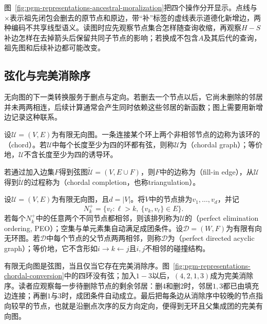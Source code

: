 图~\ref{fig:pgm-representations-ancestral-moralization}把四个操作分开显示。点线与$\times$表示祖先闭包会删去的原节点和原边，带“补”标签的虚线表示道德化新增边，两种编码不共享线型语义。读图时应先观察节点集合怎样随查询收缩，再观察$H-S$补边怎样在去掉箭头后保留共同子节点的影响；若换成不包含$A$及其后代的查询，祖先图和后续补边都可能改变。

\subsection{弦化与完美消除序}
\label{sec:pgm-representations-chordal-conversion}

无向图的下一类转换服务于删点与定向。若删去一个节点以后，它尚未删除的邻居并未两两相连，后续计算通常会产生同时依赖这些邻居的新函数；图上需要用新增边记录这种联系。

\begin{definition}[弦图与弦化]
  \label{def:pgm-representations-chordal-completion}
  设$\mathcal{U}=(V,E)$为有限无向图。一条连接某个环上两个非相邻节点的边称为该环的（chord）。若$\mathcal{U}$中每个长度至少为四的环都有弦，则称$\mathcal{U}$为（chordal graph）；等价地，$\mathcal{U}$不含长度至少为四的诱导环。

  若通过加入边集$F$得到弦图$\widetilde{\mathcal{U}}=(V,E\cup F)$，则$F$中的边称为（fill-in edge），从$\mathcal{U}$得到$\widetilde{\mathcal{U}}$的过程称为（chordal completion，也称triangulation）。
\end{definition}

\begin{definition}[完美消除序与完美有向图]
  \label{def:pgm-representations-perfect-elimination}
  设$\mathcal{U}=(V,E)$为有限无向图，且$d=|V|$。将$V$中的节点排为$v_1,\ldots,v_d$，并记
  \[
    N_k^+=
    \{v_\ell:\ell>k,\ \{v_k,v_\ell\}\in E\}.
  \]
  若每个$N_k^+$中的任意两个不同节点都相邻，则该排列称为$\mathcal{U}$的（perfect elimination ordering, PEO）；空集与单元素集自动满足成团条件。设$\mathcal{D}=(W,F)$为有限有向无环图。若$\mathcal{D}$中每个节点的父节点两两相邻，则称$\mathcal{D}$为（perfect directed acyclic graph）；等价地，它不含形如$i\to k\leftarrow j$且$i,j$不相邻的碰撞结构。
\end{definition}

有限无向图是弦图，当且仅当它存在完美消除序。图~\ref{fig:pgm-representations-chordal-conversion}中的四环没有弦；加入$1-3$以后，$(4,2,1,3)$成为完美消除序。读者应观察每一步待删除节点的剩余邻居：删$4$和删$2$时，邻居$1,3$都已由填充边连接；再删$1$与$3$时，成团条件自动成立。最后把每条边从消除序中较晚的节点指向较早的节点，也就是沿删点次序的反方向定向，便得到无环且父集成团的完美有向图。

